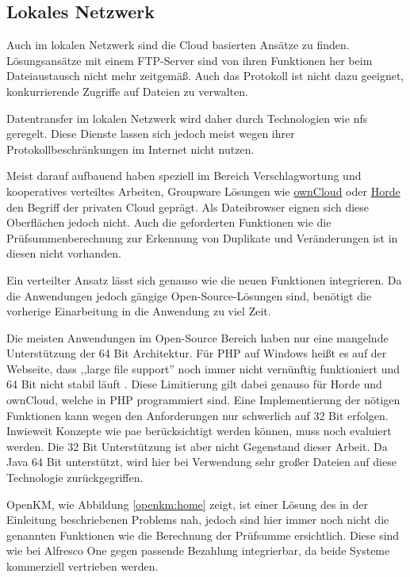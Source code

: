 \documentclass[oneside, ngerman, toc=bibliography,bibliography=totoc,listof=entryprefix, open=right,numbers=noenddot,fontsize=12pt]{scrbook}
\begin{document}
\subsection{Lokales Netzwerk}
Auch im lokalen Netzwerk sind die Cloud basierten Ansätze zu finden. Lösungsansätze mit einem FTP-Server sind von ihren Funktionen her beim Dateiaustausch nicht mehr zeitgemäß. Auch das Protokoll ist nicht dazu geeignet, konkurrierende Zugriffe auf Dateien zu verwalten.

Datentransfer im lokalen Netzwerk wird daher durch Technologien wie \acrshort{nfs} geregelt.
Diese Dienste lassen sich jedoch meist wegen ihrer Protokollbeschränkungen im Internet nicht nutzen.

Meist darauf aufbauend haben speziell im Bereich Verschlagwortung und kooperatives verteiltes Arbeiten, Groupware Lösungen wie \href{https://owncloud.org/}{{ownCloud}} oder \href{http://www.horde.org/apps/groupware}{{Horde}} den Begriff der privaten Cloud geprägt. Als Dateibrowser eignen sich diese Oberflächen jedoch nicht. Auch die geforderten Funktionen wie die Prüfsummenberechnung zur Erkennung von Duplikate und Veränderungen ist in diesen nicht vorhanden.

Ein verteilter Ansatz lässt sich genauso wie die neuen Funktionen integrieren. Da die Anwendungen jedoch gängige Open-Source-Lösungen sind, benötigt die vorherige Einarbeitung in die Anwendung zu viel Zeit. 

Die meisten Anwendungen im Open-Source Bereich haben nur eine mangelnde Unterstützung der 64 Bit Architektur. Für PHP auf Windows heißt es auf der Webseite, dass ,,large file support'' noch immer nicht vernünftig funktioniert und 64 Bit nicht stabil läuft \cite{phpw}. Diese Limitierung gilt dabei genauso für Horde und ownCloud, welche in PHP programmiert sind. Eine Implementierung der nötigen Funktionen kann wegen den Anforderungen nur schwerlich auf 32 Bit erfolgen. Inwieweit Konzepte wie \acrfull{pae} berücksichtigt werden können, muss noch evaluiert werden. Die 32 Bit Unterstützung ist aber nicht Gegenstand dieser Arbeit.
Da Java 64 Bit unterstützt, wird hier bei Verwendung sehr großer Dateien auf diese Technologie zurückgegriffen.

{OpenKM}, wie Abbildung \ref{openkm:home} zeigt, ist einer Lösung des in der Einleitung beschriebenen Problems nah, jedoch sind hier immer noch nicht die genannten Funktionen wie die Berechnung der Prüfsumme ersichtlich. Diese sind wie bei  {Alfresco One} gegen passende Bezahlung integrierbar, da beide Systeme kommerziell vertrieben werden.
\end{document}

